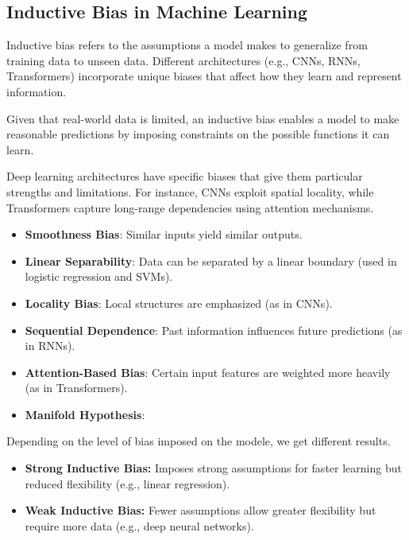 \documentclass{article}
\begin{document}
\subsection{Inductive Bias in Machine Learning}
Inductive bias refers to the assumptions a model makes to generalize from training data to unseen data. Different architectures (e.g., CNNs, RNNs, Transformers) incorporate unique biases that affect how they learn and represent information.

Given that real-world data is limited, an inductive bias enables a model to make reasonable predictions by imposing constraints on the possible functions it can learn.

Deep learning architectures have specific biases that give them particular strengths and limitations. For instance, CNNs exploit spatial locality, while Transformers capture long-range dependencies using attention mechanisms.

\begin{itemize}
    \item \textbf{Smoothness Bias}: Similar inputs yield similar outputs.
    \item \textbf{Linear Separability}: Data can be separated by a linear boundary (used in logistic regression and SVMs).
    \item \textbf{Locality Bias}: Local structures are emphasized (as in CNNs).
    \item \textbf{Sequential Dependence}: Past information influences future predictions (as in RNNs).
    \item \textbf{Attention-Based Bias}: Certain input features are weighted more heavily (as in Transformers).
	\item \textbf{Manifold Hypothesis}:
\end{itemize}

Depending on the level of bias imposed on the modele, we get different results.

\begin{itemize}
    \item \textbf{Strong Inductive Bias:} Imposes strong assumptions for faster learning but reduced flexibility (e.g., linear regression).
    \item \textbf{Weak Inductive Bias:} Fewer assumptions allow greater flexibility but require more data (e.g., deep neural networks).
\end{itemize}

\clearpage\newpage
\end{document}
